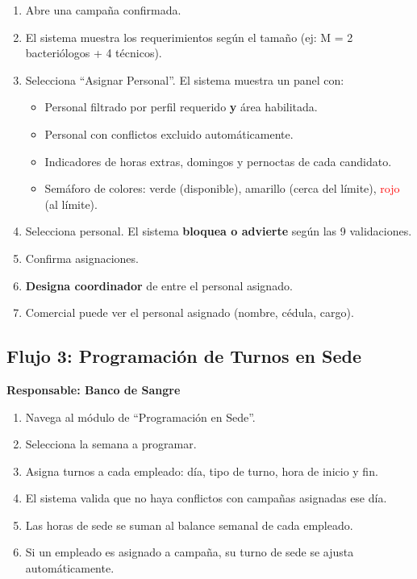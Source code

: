 \documentclass[9pt,a4paper]{extarticle}
\begin{document}
\begin{enumerate}[leftmargin=2em]
    \item Abre una campaña confirmada.
    \item El sistema muestra los requerimientos seg\'{u}n el tamaño (ej: M = 2 bacteri\'{o}logos + 4 t\'{e}cnicos).
    \item Selecciona ``Asignar Personal''. El sistema muestra un panel con:
    \begin{itemize}
        \item Personal filtrado por perfil requerido \textbf{y} \'{a}rea habilitada.
        \item Personal con conflictos excluido autom\'{a}ticamente.
        \item Indicadores de horas extras, domingos y pernoctas de cada candidato.
        \item Sem\'{a}foro de colores: \textcolor{green!70!black}{verde} (disponible), \textcolor{yellow!80!black}{amarillo} (cerca del l\'{i}mite), \textcolor{red}{rojo} (al l\'{i}mite).
    \end{itemize}
    \item Selecciona personal. El sistema \textbf{bloquea o advierte} seg\'{u}n las 9 validaciones.
    \item Confirma asignaciones.
    \item \textbf{Designa coordinador} de entre el personal asignado.
    \item Comercial puede ver el personal asignado (nombre, c\'{e}dula, cargo).
\end{enumerate}

\subsection{Flujo 3: Programaci\'{o}n de Turnos en Sede}

\textbf{Responsable: Banco de Sangre}

\begin{enumerate}[leftmargin=2em]
    \item Navega al m\'{o}dulo de ``Programaci\'{o}n en Sede''.
    \item Selecciona la semana a programar.
    \item Asigna turnos a cada empleado: d\'{i}a, tipo de turno, hora de inicio y fin.
    \item El sistema valida que no haya conflictos con campañas asignadas ese d\'{i}a.
    \item Las horas de sede se suman al balance semanal de cada empleado.
    \item Si un empleado es asignado a campaña, su turno de sede se ajusta autom\'{a}ticamente.
\end{enumerate}
\end{document}

